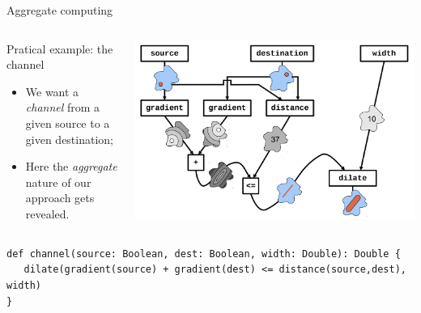 \documentclass[presentation]{beamer}\mode<presentation>{\usetheme{AMSBolognaFC}}
\begin{document}
\begin{frame}{Aggregate computing}
\begin{columns}
	\begin{column}{0.5\textwidth}
		\begin{exampleblock}{Pratical example: the channel}
			\begin{itemize}
				\item We want a \emph{channel} from a given source to a given destination;
				\item Here the \emph{aggregate} nature of our approach gets revealed.
			\end{itemize}
		\end{exampleblock}
	\end{column}
	\begin{column}{0.5\textwidth}
		\includegraphics[width=\textwidth]{img/channel.png}
	\end{column}
\end{columns}

\centering

\begin{lstlisting}
def channel(source: Boolean, dest: Boolean, width: Double): Double {
   dilate(gradient(source) + gradient(dest) <= distance(source,dest), width)
}
\end{lstlisting}

\end{frame}


\end{document}
